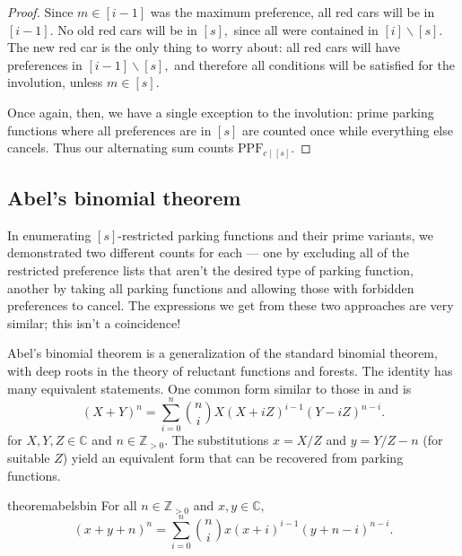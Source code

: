 \documentclass[12 pt]{amsart}
\theoremstyle{definition} %
\theoremstyle{remark} %
\begin{document}
\begin{proof}
    Since $m\in [i-1]$ was the maximum preference, all red cars will be in $[i-1]$. No old red cars will be in $[s],$ since all were contained in $[i]\backslash [s].$ The new red car is the only thing to worry about: all red cars will have preferences in $[i-1]\backslash [s],$ and therefore all conditions will be satisfied for the involution, unless $m\in [s].$

	Once again, then, we have a single exception to the involution: prime parking functions where all preferences are in $[s]$ are counted once while everything else cancels. Thus our alternating sum counts $\mathrm{PPF}_{c \mid [s]}$.
\end{proof}

\subsection{Abel's binomial theorem}

In enumerating $[s]$-restricted parking functions and their prime variants, we demonstrated two different counts for each --- one by excluding all of the restricted preference lists that aren't the desired type of parking function, another by taking all parking functions and allowing those with forbidden preferences to cancel. The expressions we get from these two approaches are very similar; this isn't a coincidence!

Abel's binomial theorem is a generalization of the standard binomial theorem, with deep roots in the theory of reluctant functions and forests. The identity has many equivalent statements. One common form similar to those in \cite{shapiro-1991} and \cite{zucker-2024} is
\[
	(X + Y)^{n} = \sum_{i = 0}^{n} \binom{n}{i} X (X + iZ)^{i - 1} (Y - i Z)^{n - i}.
\]
for $X, Y, Z \in \mathbb{C}$ and $n \in \mathbb{Z}_{> 0}$. The substitutions $x = X/Z$ and $y = Y/Z - n$ (for suitable $Z$) yield an equivalent form that can be recovered from parking functions.

\begin{restatable}{theorem}{abelsbin}
	For all $n\in\mathbb{Z}_{>0}$ and $x,y\in\mathbb{C},$
    \[
		(x + y + n)^{n} = \sum_{i = 0}^{n} \binom{n}{i} x (x + i)^{i - 1} (y + n - i)^{n - i}.
	\]
\end{restatable}
\end{document}
